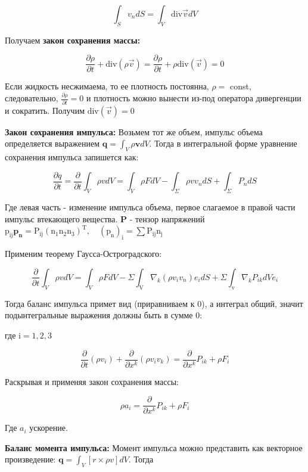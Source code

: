 $$
\int_{S} v_{n} d S=\int_{V} \mathrm{div} \vec{v} d V
$$

Получаем \textbf{закон сохранения массы:}

$$
\frac{\partial \rho}{\partial t}+\mathrm{div}(\rho \vec{v})=\frac{\partial \rho}{\partial t}+\rho \mathrm{div}(\vec{v})=0
$$

Если жидкость несжимаема, то ее плотность постоянна, $\rho=$ const, следовательно, $\frac{\partial \rho}{\partial t}=0$ и плотность можно вынести из-под оператора дивергенции и сократить. Получим $\mathrm{div}(\vec{v})=0$

\textbf{Закон сохранения импульса:} Возьмем тот же объем, импульс объема определяется выражением $\boldsymbol{q}=\int_{V} \rho \mathbf{v} d V$. Тогда в интегральной форме уравнение сохранения импульса запишется как:

$$
\frac{\partial q}{\partial t}=\frac{\partial}{\partial t} \int_{V} \rho v d V=\int_{V} \rho F d V-\int_{\Sigma} \rho v v_{n} d S+\int_{\Sigma} P_{n} d S
$$

Где левая часть - изменение импульса объема, первое слагаемое в правой части импульс втекающего вещества. $\mathbf{P}$ - тензор напряжений $\mathrm{p}_{\mathrm{ij}} \mathbf{p}_\mathbf{n}=\mathrm{P}_{\mathrm{ij}}\left(\mathrm{n}_{1} \mathrm{n}_{2} \mathrm{n}_{3}\right)^{\mathrm{T}},\quad\left(\mathrm{p}_{\mathrm{n}}\right)_{\mathrm{i}}=\sum\mathrm{P}_{\mathrm{i j}} \mathrm{n}_{\mathrm{j}}$

Применим теорему Гаусса-Остроградского:

$$
\frac{\partial}{\partial t} \int_{V} \rho v d V=\int_{V} \rho F d V-\Sigma \int_{\mathrm{V}} \nabla_{k}\left(\rho v_{i} v_{n}\right) e_{i} d S+\Sigma \int_{\mathrm{v}} \nabla_{k} P_{i k} d V e_{i}
$$

Тогда баланс импульса примет вид (приравниваем к 0), а интеграл общий, значит подынтегральные выражения должны быть в сумме 0:

где $\mathrm{i}=1,2,3$

$$
\frac{\partial}{\partial t}\left(\rho v_{i}\right)+\frac{\partial}{\partial x^{k}}\left(\rho v_{i} v_{k}\right)=\frac{\partial}{\partial x^{k}} P_{i k}+\rho F_{i}
$$

Раскрывая и применяя закон сохранения массы:

$$
\rho a_{i}=\frac{\partial}{\partial x^{k}} P_{i k}+\rho F_{i}
$$

Где $a_{i}$ ускорение.

\textbf{Баланс момента импульса:}
Момент импульса можно представить как векторное произведение: $\boldsymbol{q}=\int_{V}[r \times \rho v] d V$. Тогда

